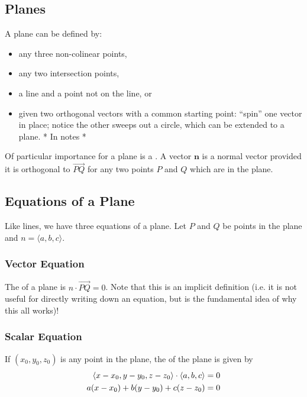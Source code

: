 \subsection{Planes}
A plane can be defined by:
\begin{itemize}
    \item any three non-colinear points,
    \item any two intersection points,
    \item a line and a point not on the line, or
    \item given two orthogonal vectors with a common starting point: ``spin''  one vector in place; notice the other sweeps out a circle, which can be extended to a plane. * In notes *
\end{itemize}
Of particular importance for a plane is a . A vector \(\mathbf{n}\) is a normal vector provided it is orthogonal to \(\overrightarrow{PQ}\) for any two points \(P\) and \(Q\) which are in the plane.

\subsection{Equations of a Plane}

Like lines, we have three equations of a plane. Let \(P\) and \(Q\) be points in the plane and \(n = \langle a,b,c \rangle\).

\subsubsection{Vector Equation}

The  of a plane is \(n \cdot \overrightarrow{PQ} = 0\). Note that this is an implicit definition (i.e. it is not useful for directly writing down an equation, but is the fundamental idea of why this all works)!

\subsubsection{Scalar Equation}

If \((x_{0},y_{0},z_{0})\) is any point in the plane, the  of the plane is given by
\begin{align*}
    \left\langle x - x_{0}, y - y_{0}, z - z_{0} \right\rangle \cdot \left\langle a,b,c \right\rangle &= 0 \\
    a(x - x_{0}) + b(y - y_{0}) + c(z - z_{0}) &= 0
\end{align*}

